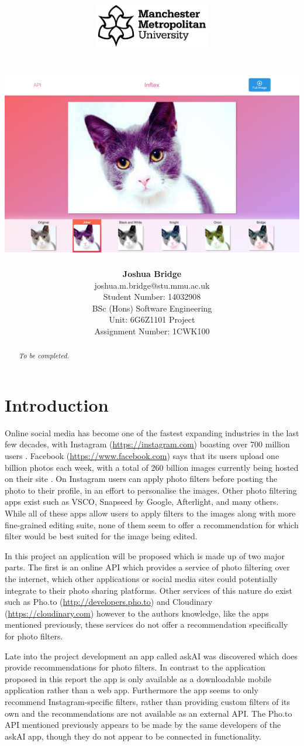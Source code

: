 \documentclass[a4paper,12pt]{report}
\title{\vspace{-3.5cm}\includegraphics[width=5cm]{mmu-white}\\\vspace{2cm}\reportTitle\\\vspace{1cm}\includegraphics[width=0.6\linewidth]{front-end-main}}
\author{\textbf{Joshua Bridge}\\joshua.m.bridge@stu.mmu.ac.uk\\Student Number: 14032908\\\vspace{2cm}BSc (Hons) Software Engineering\\Unit: 6G6Z1101 Project\\Assignment Number: 1CWK100\vspace{2cm}}
\begin{document}
\maketitle

\doublespacing

\begin{abstract}
  \textit{To be completed.}
\end{abstract}

\onehalfspacing

\tableofcontents

\listoffigures


\doublespacing

\chapter{Introduction} 
  Online social media has become one of the fastest expanding industries in the last few decades, with Instagram (\url{https://instagram.com}) boasting over 700 million users \citep{instagram2017users}. Facebook (\url{https://www.facebook.com}) says that its users upload one billion photos each week, with a total of 260 billion images currently being hosted on their site \citep{beaver2010finding}. On Instagram users can apply photo filters before posting the photo to their profile, in an effort to personalise the images. Other photo filtering apps exist such as VSCO, Snapseed by Google, Afterlight, and many others. While all of these apps allow users to apply filters to the images along with more fine-grained editing suite, none of them seem to offer a recommendation for which filter would be best suited for the image being edited.

  In this project an application will be proposed which is made up of two major parts. The first is an online API which provides a service of photo filtering over the internet, which other applications or social media sites could potentially integrate to their photo sharing platforms. Other services of this nature do exist such as Pho.to (\url{http://developers.pho.to}) and Cloudinary (\url{https://cloudinary.com}) however to the authors knowledge, like the apps mentioned previously, these services do not offer a recommendation specifically for photo filters.

  Late into the project development an app called askAI \citep{askai2017app} was discovered which does provide recommendations for photo filters. In contrast to the application proposed in this report the app is only available as a downloadable mobile application rather than a web app. Furthermore the app seems to only recommend Instagram-specific filters, rather than providing custom filters of its own and the recommendations are not available as an external API. The Pho.to API mentioned previously appears to be made by the same developers of the askAI app, though they do not appear to be connected in functionality.
\end{document}
